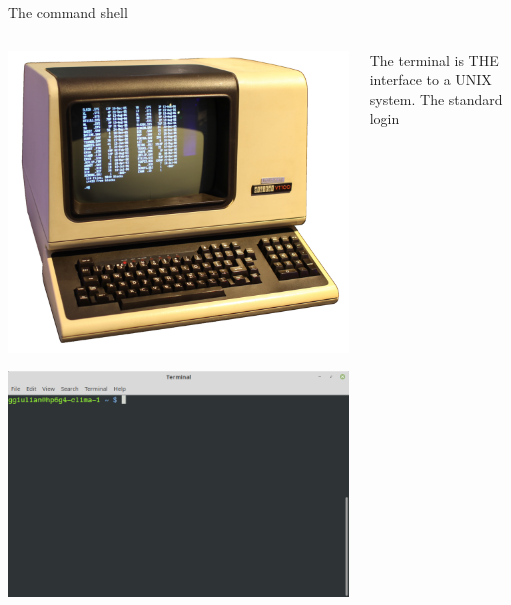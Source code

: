 \documentclass[unknownkeysallowed, 10pt, a4 paper, handout]{beamer}
\begin{document}
\begin{frame}[label=shell]{The command shell}
  \begin{columns}[T]
    \begin{column}{.53\textwidth}
      \begin{center}
        \includegraphics[scale=0.3]{pics/vt100.png}
      \end{center}
      \vfill
      \includegraphics[scale=0.20]{pics/shell.png}
    \end{column}
    \hfill
    \begin{column}{.46\textwidth}
    \small{
      The terminal is THE interface to a UNIX system. The standard login
}
\end{column}
\end{columns}
\end{frame}
\end{document}
